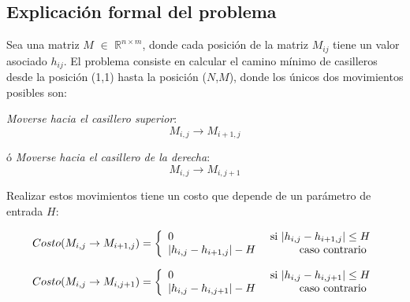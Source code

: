 \subsection{Explicación formal del problema}

Sea una matriz $M$ $\in$ $\mathbb{R}^{n \times m}$, donde cada posición de la matriz $M_{ij}$ tiene un valor asociado $h_{ij}$. El problema consiste en calcular el camino mínimo de casilleros desde la posición (1,1) hasta la posición ($N$,$M$), donde los únicos dos  movimientos posibles son:

\emph{Moverse hacia el casillero superior}: \[M_{i,j} \rightarrow M_{i+1,j}\] 

ó \emph{Moverse hacia el casillero de la derecha}: \[M_{i,j} \rightarrow M_{i,j+1}\]

Realizar estos movimientos tiene un costo que depende de un parámetro de entrada $H$:

\begin{equation} \label{costoHaciaArriba}
   Costo(M_{i,j} \rightarrow M_{i+1,j}) = \left\{ 
     \begin{array}{lr}
       0 							& $ si $  |h_{i,j} - h_{i+1,j}| \leq H \\
       |h_{i,j} - h_{i+1,j}| - H 	&   $ caso contrario $ \\
     \end{array}
   \right.
\end{equation} 

\begin{equation}\label{costoHaciaDerecha}
  Costo(M_{i,j} \rightarrow M_{i,j+1}) = \left\{ 
     \begin{array}{lr}
       0 							& $ si $  |h_{i,j} - h_{i,j+1}| \leq H \\
       |h_{i,j} - h_{i,j+1}| - H 	&   $ caso contrario $ \\
     \end{array}
   \right.
\end{equation} 

